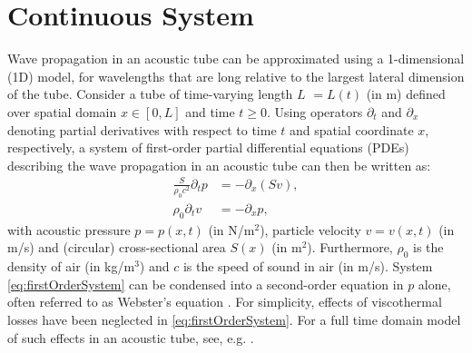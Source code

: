 \section{Continuous System}\label{sec:continuous}
Wave propagation in an acoustic tube can be approximated using a 1-dimensional (1D) model, for wavelengths that are long relative to the largest lateral dimension of the tube. Consider a tube of time-varying length $L$ $=L(t)$ (in m) defined over spatial domain $x\in [0, L]$ and time $t\geq 0$. Using operators $\partial_t$ and $\partial_x$ denoting partial derivatives with respect to time $t$ and spatial coordinate $x$, respectively, a system of first-order partial differential equations (PDEs) describing the wave propagation in an acoustic tube can then be written as:
\begin{subequations}\label{eq:firstOrderSystem}
    \begin{align}
        \frac{S}{\rho_0 c^2}\partial_t p &= -\partial_x(Sv),\label{eq:contPressure}\\
        \rho_0\partial_tv &= -\partial_xp,\label{eq:contVelocity}
    \end{align}
\end{subequations}
with acoustic pressure $p = p(x,t)$ (in N/m$^2$), particle velocity $v = v(x,t)$ (in m/s) and (circular) cross-sectional area $S(x)$ (in m$^2$). Furthermore, $\rho_0$ is the density of air (in kg/m$^3$) and $c$ is the speed of sound in air (in m/s). System \eqref{eq:firstOrderSystem} can be condensed into a second-order equation in $p$ alone, often referred to as Webster's equation \cite{Webster19}.  %
For simplicity, effects of viscothermal losses have been neglected in \eqref{eq:firstOrderSystem}. For a full time domain model of such effects in an acoustic tube, see, e.g. \cite{Bilbao2016}. 

